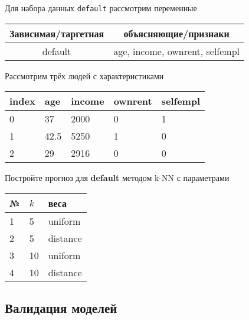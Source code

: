 \begin{exercise}
Для набора данных \texttt{default} рассмотрим переменные
\begin{center}
	\begin{tabular}{|c|c|} \hline
		Зависимая/таргетная & объясняющие/признаки \\ \hline
		default & age, income, ownrent, selfempl \\ \hline
	\end{tabular}
\end{center}
Рассмотрим трёх людей с характеристиками
	\begin{center}
		\begin{tabular}{|l||l|l|l|l|}\hline
			index & age & income & ownrent & selfempl  \\ \hline\hline
			0 & 37 & 2000 & 0 & 1  \\
			1 & 42.5 & 5250 & 1 & 0  \\
			2 & 29 & 2916 & 0 & 0  \\ \hline
		\end{tabular}
	\end{center}
Постройте прогноз для \textbf{default} методом k-NN с параметрами
\begin{center}
	\begin{tabular}{|l|l|l|}\hline
	№ & \(k\) & веса \\ \hline
	1 & 5 & uniform \\
	2 & 5 & distance \\
	3 & 10 & uniform \\
	4 & 10 & distance \\ \hline
	\end{tabular}
\end{center}
\end{exercise}

\subsection{Валидация моделей}

